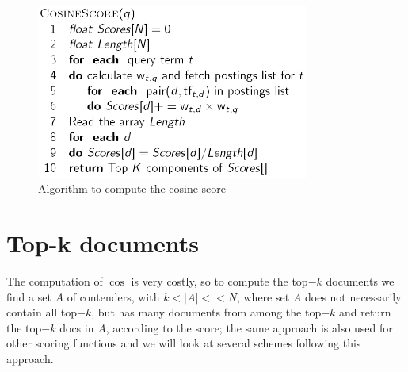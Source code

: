 \begin{figure}
	\includegraphics[width=0.8\textwidth]{Images/computeCosineScore}
	\caption{Algorithm to compute the cosine score}
	\label{img:computeCosine}
\end{figure}

\section{Top-k documents}
The computation of $\cos$ is very costly, so to compute the top$-k$ 
documents we find a set $A$ of contenders, with $k < |A| << N$,
where set $A$ does not necessarily contain all top$-k$, but has many
documents from among the top$-k$ and return the top$-k$ docs in $A$,
according to the score; the same approach is also used for other 
scoring functions and we will look at several schemes following this approach.

